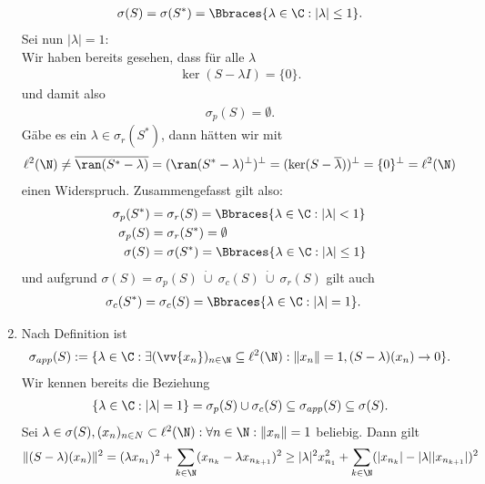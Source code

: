 \begin{solution}
\begin{enumerate}[label = (\alph*)]
\begin{align*}
    \sigma(S) = \sigma(S^*) = \Bbraces{\lambda \in \C: |\lambda| \leq 1}.
  \end{align*}
  Sei nun $|\lambda| = 1$: \\
  Wir haben bereits gesehen, dass für alle $\lambda$
  \begin{align*}
    \ker(S - \lambda I) = \{0\}.
  \end{align*}
  und damit also
  \begin{align*}
    \sigma_p(S) = \emptyset.
  \end{align*}
  Gäbe es ein $\lambda \in \sigma_r(S^*)$, dann hätten wir mit
  \begin{align*}
    \ell^2(\N) \neq \overline{\ran(S^* - \lambda)} = (\ran(S^* - \lambda)^{\bot})^{\bot} =
    (\ker(S - \overline{\lambda}))^{\bot} = \{0\}^{\bot} = \ell^2(\N)
  \end{align*}
  einen Widerspruch. Zusammengefasst gilt also:
  \begin{align*}
    \sigma_p(S^\ast) &= \sigma_r(S) = \Bbraces{\lambda \in \C: |\lambda| < 1} \\
    \sigma_p(S) &= \sigma_r(S^*) = \emptyset \\
    \sigma(S) &= \sigma(S^*) = \Bbraces{\lambda \in \C: |\lambda| \leq 1}
  \end{align*}
  und aufgrund $\sigma(S) = \sigma_p(S) ~\dot \cup~ \sigma_c(S) ~\dot \cup~ \sigma_r(S)$ gilt auch
  \begin{align*}
    \sigma_c(S^\ast) &= \sigma_c(S) = \Bbraces{\lambda \in \C: |\lambda| = 1}.
  \end{align*}
  \item Nach Definition ist
  \begin{align*}
    \sigma_{app}(S) := \{\lambda \in \C: \exists (\vv{x_n})_{n \in \N} \subseteq \ell^2(\N): \|x_n\| = 1, (S - \lambda)(x_n) \to 0\}.
  \end{align*}
  Wir kennen bereits die Beziehung
  \begin{align*}
    \{\lambda \in \C: |\lambda| = 1 \} = \sigma_p(S) \cup \sigma_c(S) \subseteq \sigma_{app}(S) \subseteq \sigma(S).
  \end{align*}
  Sei $\lambda \in \sigma(S), (x_n)_{n \in N} \subset \ell^2(\N): \forall n \in \N: \|x_n\| = 1$ beliebig. Dann gilt
  \begin{align*}
    \|(S - \lambda)(x_n)\|^2 &=  (\lambda x_{n_1})^2 + \sum_{k \in \N}(x_{n_k}- \lambda x_{n_{k+1}})^2
    \geq |\lambda|^2x_{n_1}^2 + \sum_{k \in \N}(|x_{n_k}|- |\lambda| |x_{n_{k+1}}|)^2 \\

\end{align*}
\end{enumerate}
\end{solution}
